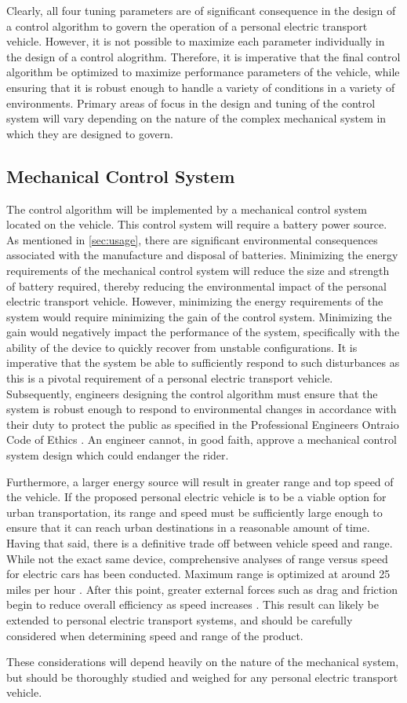Clearly, all four tuning parameters are of significant consequence in the design of a control algorithm to govern the operation of a personal electric transport vehicle. 
However, it is not possible to maximize each parameter individually in the design of a control alogrithm. 
Therefore, it is imperative that the final control algorithm be optimized to maximize performance parameters of the vehicle, while ensuring that it is robust enough to handle a variety of conditions in a variety of environments. 
Primary areas of focus in the design and tuning of the control system will vary depending on the nature of the complex mechanical system in which they are designed to govern.

\subsection{Mechanical Control System}
The control algorithm will be implemented by a mechanical control system located on the vehicle. 
This control system will require a battery power source.
As mentioned in \ref{sec:usage}, there are significant environmental consequences associated with the manufacture and disposal of batteries. 
Minimizing the energy requirements of the mechanical control system will reduce the size and strength of battery required, thereby reducing the environmental impact of the personal electric transport vehicle.  
However, minimizing the energy requirements of the system would require minimizing the gain of the control system. 
Minimizing the gain would negatively impact the performance of the system, specifically with the ability of the device to quickly recover from unstable configurations. 
It is imperative that the system be able to sufficiently respond to such disturbances as this is a pivotal requirement of a personal electric transport vehicle. 
Subsequently, engineers designing the control algorithm must ensure that the system is robust enough to respond to environmental changes in accordance with their duty to protect the public as specified in the Professional Engineers Ontraio Code of Ethics \cite{PEO}. 
An engineer cannot, in good faith, approve a mechanical control system design which could endanger the rider. 

Furthermore, a larger energy source will result in greater range and top speed of the vehicle. 
If the proposed personal electric vehicle is to be a viable option for urban transportation, its range and speed must be sufficiently large enough to ensure that it can reach urban destinations in a reasonable amount of time.
Having that said, there is a definitive trade off between vehicle speed and range. While not the exact same device, comprehensive analyses of range versus speed for electric cars has been conducted. Maximum range is optimized at around 25 miles per hour \cite{speeddrag}. After this point, greater external forces such as drag and friction begin to reduce overall efficiency as speed increases \cite{speeddrag}. This result can likely be extended to personal electric transport systems, and should be carefully considered when determining speed and range of the product.

These considerations will depend heavily on the nature of the mechanical system, but should be thoroughly studied and weighed for any personal electric transport vehicle.
